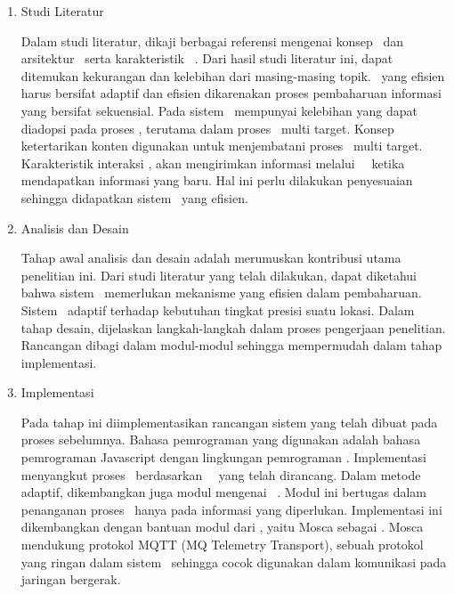 \begin{enumerate}
  [noitemsep,
  nolistsep,
  leftmargin=0cm,
  itemindent=.5cm,
  listparindent=\parindent]

  \item Studi Literatur

    Dalam studi literatur, dikaji berbagai referensi mengenai konsep
    \tracking~dan arsitektur \pubsub~serta karakteristik \context~\aware. Dari
    hasil studi literatur ini, dapat ditemukan kekurangan dan kelebihan dari
    masing-masing topik. \Tracking~yang efisien harus bersifat adaptif dan
    efisien dikarenakan proses pembaharuan informasi yang bersifat sekuensial.
    Pada sistem \pubsub~mempunyai kelebihan yang dapat diadopsi pada proses
    \tracking, terutama dalam proses \tracking~multi target. Konsep ketertarikan
    konten digunakan untuk menjembatani proses \tracking~multi target.
    Karakteristik interaksi \pubsub, akan mengirimkan informasi melalui
    \event~\publish~ketika mendapatkan informasi yang baru. Hal ini perlu
    dilakukan penyesuaian sehingga didapatkan sistem \pubsub~yang efisien.

  \item Analisis dan Desain

    Tahap awal analisis dan desain adalah merumuskan kontribusi utama penelitian
    ini. Dari studi literatur yang telah dilakukan, dapat diketahui bahwa
    sistem \tracking~memerlukan mekanisme yang efisien dalam pembaharuan.
    Sistem \tracking~adaptif terhadap kebutuhan tingkat presisi suatu lokasi.
    Dalam tahap desain, dijelaskan langkah-langkah dalam proses pengerjaan
    penelitian. Rancangan dibagi dalam modul-modul sehingga mempermudah dalam
    tahap implementasi.

  \item Implementasi

    Pada tahap ini diimplementasikan rancangan sistem yang telah dibuat pada
    proses sebelumnya. Bahasa pemrograman yang digunakan adalah bahasa
    pemrograman Javascript dengan lingkungan pemrograman \nodejs. Implementasi
    menyangkut proses \content~\filtering berdasarkan
    \subscription~\language~yang telah dirancang. Dalam metode adaptif,
    dikembangkan juga modul mengenai \idle~\manager. Modul ini bertugas dalam
    penanganan proses \tracking~hanya pada informasi yang diperlukan.
    Implementasi ini dikembangkan dengan bantuan modul dari \nodejs, yaitu Mosca
    sebagai \middleware. Mosca mendukung protokol MQTT (MQ Telemetry Transport),
    sebuah protokol yang ringan dalam sistem \pubsub~sehingga cocok digunakan
    dalam komunikasi pada jaringan bergerak.


\end{enumerate}
